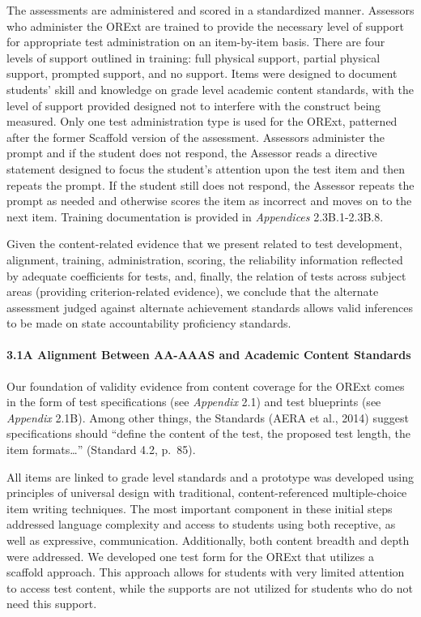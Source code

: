 \documentclass[]{article}
\let\oldparagraph\paragraph
\renewcommand{\paragraph}[1]{\oldparagraph{#1}\mbox{}}
\begin{document}
The assessments are administered and scored in a standardized manner.
Assessors who administer the ORExt are trained to provide the necessary
level of support for appropriate test administration on an item-by-item
basis. There are four levels of support outlined in training: full
physical support, partial physical support, prompted support, and no
support. Items were designed to document students' skill and knowledge
on grade level academic content standards, with the level of support
provided designed not to interfere with the construct being measured.
Only one test administration type is used for the ORExt, patterned after
the former Scaffold version of the assessment. Assessors administer the
prompt and if the student does not respond, the Assessor reads a
directive statement designed to focus the student's attention upon the
test item and then repeats the prompt. If the student still does not
respond, the Assessor repeats the prompt as needed and otherwise scores
the item as incorrect and moves on to the next item. Training
documentation is provided in \emph{Appendices} 2.3B.1-2.3B.8.

Given the content-related evidence that we present related to test
development, alignment, training, administration, scoring, the
reliability information reflected by adequate coefficients for tests,
and, finally, the relation of tests across subject areas (providing
criterion-related evidence), we conclude that the alternate assessment
judged against alternate achievement standards allows valid inferences
to be made on state accountability proficiency standards.

\hypertarget{a-alignment-between-aa-aaas-and-academic-content-standards}{%
\paragraph{3.1A Alignment Between AA-AAAS and Academic Content
Standards}\label{a-alignment-between-aa-aaas-and-academic-content-standards}}

Our foundation of validity evidence from content coverage for the ORExt
comes in the form of test specifications (see \emph{Appendix} 2.1) and
test blueprints (see \emph{Appendix} 2.1B). Among other things, the
Standards (AERA et al., 2014) suggest specifications should ``define the
content of the test, the proposed test length, the item
formats\ldots{}'' (Standard 4.2, p.~85).

All items are linked to grade level standards and a prototype was
developed using principles of universal design with traditional,
content-referenced multiple-choice item writing techniques. The most
important component in these initial steps addressed language complexity
and access to students using both receptive, as well as expressive,
communication. Additionally, both content breadth and depth were
addressed. We developed one test form for the ORExt that utilizes a
scaffold approach. This approach allows for students with very limited
attention to access test content, while the supports are not utilized
for students who do not need this support.
\end{document}
